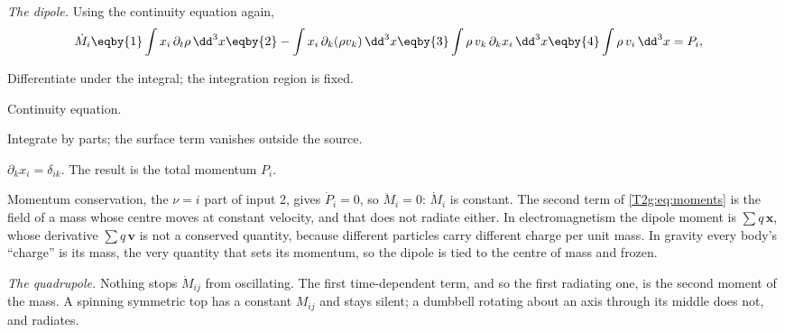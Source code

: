 \emph{The dipole.} Using the continuity equation again,
\begin{align}
  \dot M_i
  &\eqby{1}\int x_i\,\partial_t\rho\,\dd^3x
  \eqby{2}-\int x_i\,\partial_k(\rho v_k)\,\dd^3x
  \eqby{3}\int\rho\,v_k\,\partial_kx_i\,\dd^3x
  \eqby{4}\int\rho\,v_i\,\dd^3x=P_i ,
  \label{T2g:eq:dipole}
\end{align}
\begin{explain}
  \item Differentiate under the integral; the integration region is fixed.
  \item Continuity equation.
  \item Integrate by parts; the surface term vanishes outside the source.
  \item $\partial_kx_i=\delta_{ik}$. The result is the total momentum $P_i$.
\end{explain}
Momentum conservation, the $\nu=i$ part of input 2, gives $\dot P_i=0$, so $\ddot M_i=0$: $\dot M_i$ is constant. The second term of \eqref{T2g:eq:moments} is the field of a mass whose centre moves at constant velocity, and that does not radiate either. In electromagnetism the dipole moment is $\sum q\,\bm x$, whose derivative $\sum q\,\bm v$ is not a conserved quantity, because different particles carry different charge per unit mass. In gravity every body's ``charge'' is its mass, the very quantity that sets its momentum, so the dipole is tied to the centre of mass and frozen.

\emph{The quadrupole.} Nothing stops $\ddot M_{ij}$ from oscillating. The first time-dependent term, and so the first radiating one, is the second moment of the mass. A spinning symmetric top has a constant $M_{ij}$ and stays silent; a dumbbell rotating about an axis through its middle does not, and radiates.

